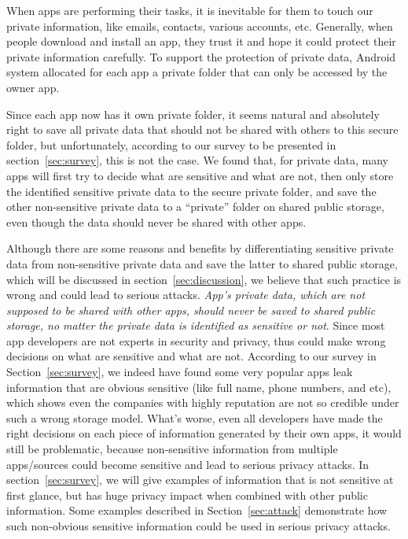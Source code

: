 \documentclass{sig-alternate}
\begin{document}
When apps are performing their tasks, it is inevitable for them to touch our private information, like emails, contacts, various accounts, etc. Generally, when people download and install an app, they trust it and hope it could protect their private information carefully. To support the protection of private data, Android system allocated for each app a private folder that can only be accessed by the owner app.

Since each app now has it own private folder, it seems natural and absolutely right to save all private data that should not be shared with others to this secure folder, but unfortunately, according to our survey to be presented in section~\ref{sec:survey}, this is not the case. We found that, for private data, many apps will first try to decide what are sensitive and what are not, then only store the identified sensitive private data to the secure private folder, and save the other non-sensitive private data to a ``private'' folder on shared public storage, even though the data should never be shared with other apps.


Although there are some reasons and benefits by differentiating sensitive private data from non-sensitive private data and save the latter to shared public storage, which will be discussed in section~\ref{sec:discussion}, we believe that such practice is wrong and could lead to serious attacks. \textit{App's private data, which are not supposed to be shared with other apps, should never be saved to shared public storage, no matter the private data is identified as sensitive or not}. Since most app developers are not experts in security and privacy, thus could make wrong decisions on what are sensitive and what are not. According to our survey in Section~\ref{sec:survey}, we indeed have found some very popular apps leak information that are obvious sensitive (like full name, phone numbers, and etc), which shows even the companies with highly reputation are not so credible under such a wrong storage model. What's worse, even all developers have made the right decisions on each piece of information generated by their own apps, it would still be problematic, because non-sensitive information from multiple apps/sources could become sensitive and lead to serious privacy attacks. In section~\ref{sec:survey}, we will give examples of information that is not sensitive at first glance, but has huge privacy impact when combined with other public information. Some examples described in Section~\ref{sec:attack} demonstrate how such non-obvious sensitive information could be used in serious privacy attacks.
\end{document}
